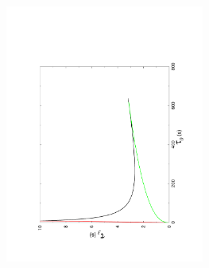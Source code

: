 \documentclass{minimal}
\begin{document}
\begin{center}
\includegraphics[angle=-90,width=0.49\textwidth]{./LALInspiralBankHt0t3}
\end{center}
\end{document}
